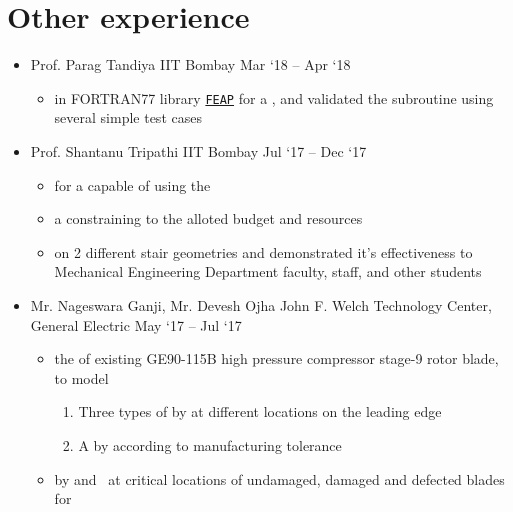 \documentclass[a4paper,10pt]{article}
\newcommand{\feap}{\href{https://www.cs.cornell.edu/~bindel//blurbs/feap.html}{\texttt{FEAP}}}
\begin{document}
\section{Other experience}
\begin{itemize}
	\item {}
	{Prof. Parag Tandiya}
	{IIT Bombay}
	{Mar `18 -- Apr `18}
	\begin{itemize}
		\item {} in FORTRAN77 library \feap{} for a , and validated the subroutine using several simple test cases
	\end{itemize}
	\item {}
	{Prof. Shantanu Tripathi}
	{IIT Bombay}
	{Jul `17 -- Dec `17}
	\begin{itemize}
		\item {} for a  capable of  using the 
		\item {} a   constraining to the alloted budget and resources
		\item {} on 2 different stair geometries and demonstrated it's effectiveness to Mechanical Engineering Department faculty, staff, and other students
	\end{itemize}
	\item {}
	{Mr. Nageswara Ganji, Mr. Devesh Ojha}
	{John F. Welch Technology Center, General Electric}
	{May `17 -- Jul `17}
	\begin{itemize}
		\item {} the  of existing GE90-115B high pressure compressor stage-9 rotor blade, to model
		\begin{enumerate}
			\item Three types of  by  at different locations on the leading edge
			\item A  by  according to manufacturing tolerance
		\end{enumerate}
		\item {} by  and \ at critical locations of undamaged, damaged and defected blades for 
	\end{itemize}
\end{itemize}
\end{document}
